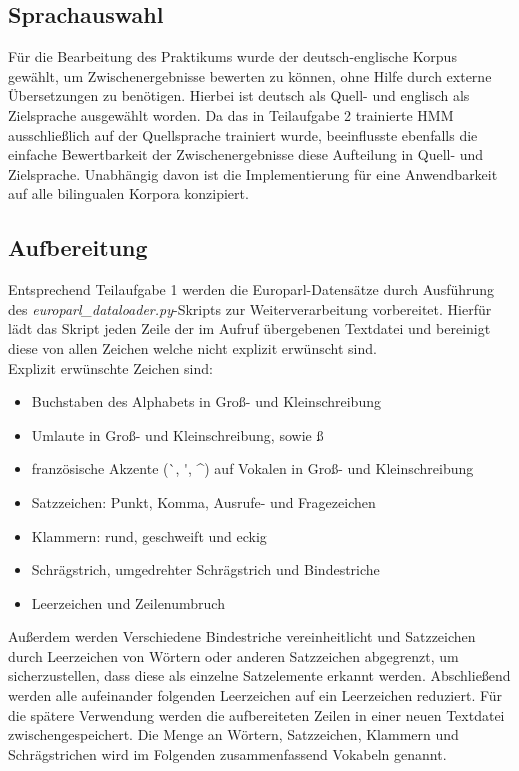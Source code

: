 \documentclass[conference]{IEEEtran}
\begin{document}
\subsection{Sprachauswahl}
Für die Bearbeitung des Praktikums wurde der deutsch-englische Korpus gewählt, um Zwischenergebnisse bewerten zu können, ohne Hilfe durch externe Übersetzungen zu benötigen.
Hierbei ist deutsch als Quell- und englisch als Zielsprache ausgewählt worden.
Da das in Teilaufgabe 2 trainierte HMM ausschließlich auf der Quellsprache trainiert wurde, beeinflusste ebenfalls die einfache Bewertbarkeit der Zwischenergebnisse diese Aufteilung in Quell- und Zielsprache.
Unabhängig davon ist die Implementierung für eine Anwendbarkeit auf alle bilingualen Korpora konzipiert.

\subsection{Aufbereitung}
Entsprechend Teilaufgabe 1 werden die Europarl-Datensätze durch Ausführung des \textit{europarl\_dataloader.py}-Skripts zur Weiterverarbeitung vorbereitet.
Hierfür lädt das Skript jeden Zeile der im Aufruf übergebenen Textdatei und bereinigt diese von allen Zeichen welche nicht explizit erwünscht sind. \\
Explizit erwünschte Zeichen sind:
\begin{itemize}
    \item Buchstaben des Alphabets in Groß- und Kleinschreibung
    \item Umlaute in Groß- und Kleinschreibung, sowie ß
    \item französische Akzente (\`{\space}, \'{\space}, \^{\space}) auf Vokalen in Groß- und Kleinschreibung
    \item Satzzeichen: Punkt, Komma, Ausrufe- und Fragezeichen
    \item Klammern: rund, geschweift und eckig
    \item Schrägstrich, umgedrehter Schrägstrich und Bindestriche
    \item Leerzeichen und Zeilenumbruch
\end{itemize}
Außerdem werden Verschiedene Bindestriche vereinheitlicht und Satzzeichen durch Leerzeichen von Wörtern oder anderen Satzzeichen abgegrenzt, um sicherzustellen, dass diese als einzelne Satzelemente erkannt werden.
Abschließend werden alle aufeinander folgenden Leerzeichen auf ein Leerzeichen reduziert.
Für die spätere Verwendung werden die aufbereiteten Zeilen in einer neuen Textdatei zwischengespeichert.
Die Menge an Wörtern, Satzzeichen, Klammern und Schrägstrichen wird im Folgenden zusammenfassend Vokabeln genannt.
\end{document}
